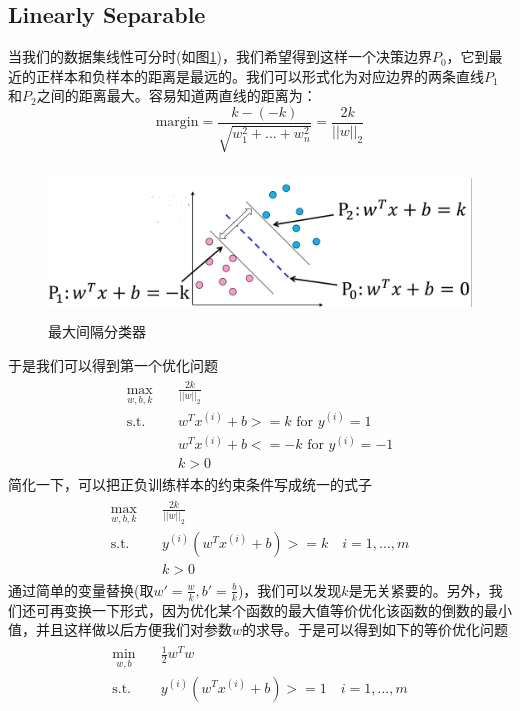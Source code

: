 \documentclass[11pt]{article}
\begin{document}
\subsection{Linearly Separable}
当我们的数据集线性可分时(如图\ref{img1})，我们希望得到这样一个决策边界$P_0$，它到最近的正样本和负样本的距离是最远的。我们可以形式化为对应边界的两条直线$P_1$和$P_2$之间的距离最大。容易知道两直线的距离为：
\begin{equation}
\text{margin} = \frac{k - (-k)}{\sqrt{w_1^2+...+w_n^2}} = \frac{2k}{||w||_2}
\end{equation}
\begin{figure}
	\centering
	\includegraphics[height=4cm]{images/img4.png}
	\caption{最大间隔分类器}
	\label{img1}
\end{figure}
于是我们可以得到第一个优化问题
\begin{align}
\begin{split}
\max_{w, b, k}\quad&\frac{2k}{||w||_2}\\
\text{s.t.}\quad&w^Tx^{(i)}+b>=k\text{ for }y^{(i)}=1\\
&w^Tx^{(i)}+b<=-k\text{ for }y^{(i)}=-1\\
&k>0
\end{split}
\end{align}
简化一下，可以把正负训练样本的约束条件写成统一的式子
\begin{align}
\begin{split}
\max_{w, b, k}\quad&\frac{2k}{||w||_2}\\
\text{s.t.}\quad&y^{(i)}(w^Tx^{(i)}+b)>=k\quad i = 1,...,m\\
&k>0
\end{split}
\end{align}
通过简单的变量替换(取$w'=\frac{w}{k}, b'=\frac{b}{k}$)，我们可以发现$k$是无关紧要的。另外，我们还可再变换一下形式，因为优化某个函数的最大值等价优化该函数的倒数的最小值，并且这样做以后方便我们对参数$w$的求导。于是可以得到如下的等价优化问题
\begin{align}\label{eq:2}
\begin{split}
\min_{w, b}\quad&\frac{1}{2}w^Tw\\
\text{s.t.}\quad&y^{(i)}(w^Tx^{(i)}+b)>=1\quad i = 1,...,m\\
\end{split}
\end{align}
\end{document}
